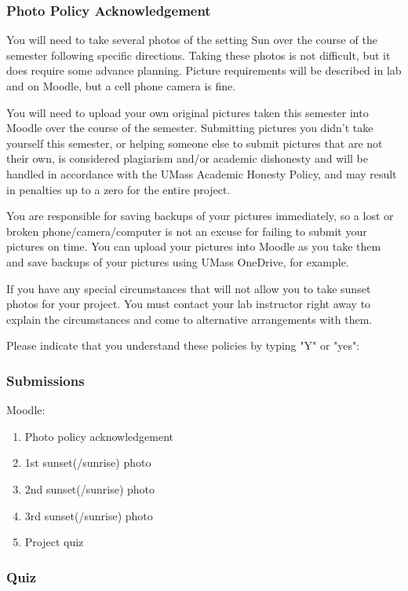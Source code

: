 \documentclass[12pt]{article}
\begin{document}
\subsubsection{Photo Policy Acknowledgement}

You will need to take several photos of the setting Sun over the course of the semester following specific directions. Taking these photos is not difficult, but it does require some advance planning. Picture requirements will be described in lab and on Moodle, but a cell phone camera is fine.

You will need to upload your own original pictures taken this semester into Moodle over the course of the semester. Submitting pictures you didn't take yourself this semester, or helping someone else to submit pictures that are not their own, is considered plagiarism and/or academic dishonesty and will be handled in accordance with the UMass Academic Honesty Policy, and may result in penalties up to a zero for the entire project.

You are responsible for saving backups of your pictures immediately, so a lost or broken phone/camera/computer is not an excuse for failing to submit your pictures on time. You can upload your pictures into Moodle as you take them and save backups of your pictures using UMass OneDrive, for example.

If you have any special circumstances that will not allow you to take sunset photos for your project. You must contact your lab instructor right away to explain the circumstances and come to alternative arrangements with them.

Please indicate that you understand these policies by typing "Y" or "yes":

\subsubsection{Submissions}

Moodle:
\begin{enumerate}
\item Photo policy acknowledgement
\item 1st sunset(/sunrise) photo
\item 2nd sunset(/sunrise) photo
\item 3rd sunset(/sunrise) photo
\item Project quiz
\end{enumerate}


\subsubsection {Quiz}
\end{document}
